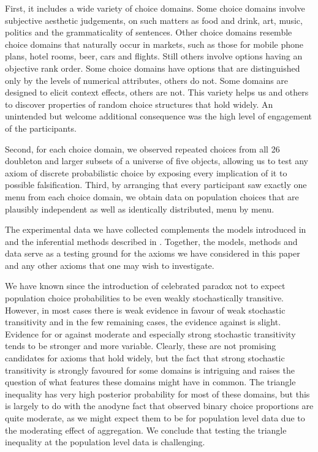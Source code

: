 \documentclass[11pt,letter]{article}
\newcommand{\menu}{menu}
\begin{document}
First, it includes a wide variety of choice domains.
Some choice domains involve subjective aesthetic judgements, on such matters as food and drink, art, music, politics and the grammaticality of sentences.
Other choice domains resemble choice domains that naturally occur in markets, such as those for mobile phone plans, hotel rooms, beer, cars and flights.
Still others involve options having an objective rank order.
Some choice domains have options that are distinguished only by the levels of numerical attributes, others do not.
Some domains are designed to elicit context effects, others are not.
This variety helps us and others to discover properties of random choice structures that hold widely.
An unintended but welcome additional consequence was the high level of engagement of the participants.

Second, for each choice domain, we observed repeated choices from all 26 doubleton and larger subsets of a universe of five objects, allowing us to test any axiom of discrete probabilistic choice by exposing every implication of it to possible falsification.
Third, by arranging that every participant saw exactly one \menu{} from each choice domain, we obtain data on population choices that are plausibly independent as well as identically distributed, \menu{} by \menu{}.

The experimental data we have collected complements the models introduced in  and the inferential methods described in .
Together, the models, methods and data serve as a testing ground for the axioms we have considered in this paper and any other axioms that one may wish to investigate.

We have known since the introduction of  celebrated paradox not to expect population choice probabilities to be even weakly stochastically transitive.
However, in most cases there is weak evidence in favour of weak stochastic transitivity and in the few remaining cases, the evidence against is slight.
Evidence for or against moderate and especially strong stochastic transitivity tends to be stronger and more variable.
Clearly, these are not promising candidates for axioms that hold widely, but the fact that strong stochastic transitivity is strongly favoured for some domains is intriguing and raises the question of what features these domains might have in common.
The triangle inequality has very high posterior probability for most of these domains, but this is largely to do with the anodyne fact that observed binary choice proportions are quite moderate, as we might expect them to be for population level data due to the moderating effect of aggregation.
We conclude that testing the triangle inequality at the population level data is challenging.
\end{document}

